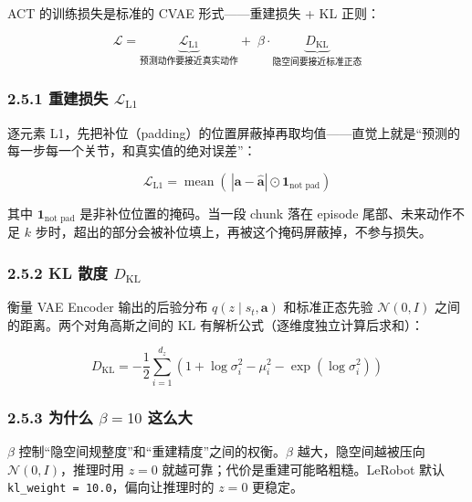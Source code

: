 \documentclass[
  chinese,
]{ctexart}
\begin{document}
ACT 的训练损失是标准的 CVAE 形式------重建损失 + KL 正则：

\[
\mathcal{L} = \underbrace{\mathcal{L}_{\text{L1}}}_{\text{预测动作要接近真实动作}} + \;\beta \cdot \underbrace{D_{\text{KL}}}_{\text{隐空间要接近标准正态}}
\]

\subsubsection{\texorpdfstring{2.5.1 重建损失
\(\mathcal{L}_{\text{L1}}\)}{2.5.1 重建损失 \textbackslash mathcal\{L\}\_\{\textbackslash text\{L1\}\}}}\label{ux91cdux5efaux635fux5931-mathcall_textl1}

逐元素
L1，先把补位（padding）的位置屏蔽掉再取均值------直觉上就是``预测的每一步每一个关节，和真实值的绝对误差''：

\[
\mathcal{L}_{\text{L1}} = \operatorname{mean}\!\left(\,|\mathbf{a} - \hat{\mathbf{a}}| \odot \mathbf{1}_{\text{not pad}}\right)
\]

其中 \(\mathbf{1}_{\text{not pad}}\) 是非补位位置的掩码。当一段 chunk
落在 episode 尾部、未来动作不足 \(k\)
步时，超出的部分会被补位填上，再被这个掩码屏蔽掉，不参与损失。

\subsubsection{\texorpdfstring{2.5.2 KL 散度
\(D_{\text{KL}}\)}{2.5.2 KL 散度 D\_\{\textbackslash text\{KL\}\}}}\label{kl-ux6563ux5ea6-d_textkl}

衡量 VAE Encoder 输出的后验分布 \(q(z \mid s_t, \mathbf{a})\)
和标准正态先验 \(\mathcal{N}(0, I)\) 之间的距离。两个对角高斯之间的 KL
有解析公式（逐维度独立计算后求和）：

\[
D_{\text{KL}} = -\frac{1}{2} \sum_{i=1}^{d_z} \left( 1 + \log\sigma_i^2 - \mu_i^2 - \exp(\log\sigma_i^2) \right)
\]

\subsubsection{\texorpdfstring{2.5.3 为什么 \(\beta = 10\)
这么大}{2.5.3 为什么 \textbackslash beta = 10 这么大}}\label{ux4e3aux4ec0ux4e48-beta-10-ux8fd9ux4e48ux5927}

\(\beta\) 控制``隐空间规整度''和``重建精度''之间的权衡。\(\beta\)
越大，隐空间越被压向 \(\mathcal{N}(0, I)\)，推理时用 \(z=0\)
就越可靠；代价是重建可能略粗糙。LeRobot 默认
\texttt{kl\_weight\ =\ 10.0}，偏向让推理时的 \(z=0\) 更稳定。
\end{document}
